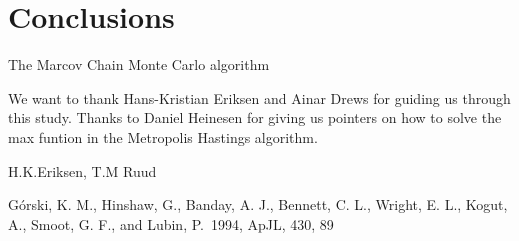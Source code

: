 \documentclass{emulateapj}
\begin{document}



\section{Conclusions}
\label{sec:conclusions}


The Marcov Chain Monte Carlo algorithm 



\begin{acknowledgements}
  We want to thank Hans-Kristian Eriksen and Ainar Drews for guiding us through this study. Thanks to Daniel Heinesen for giving us pointers on how to solve the max funtion in the Metropolis Hastings algorithm.
\end{acknowledgements}

\begin{thebibliography}{}

 H.K.Eriksen, T.M Ruud
\label{bib:assignment}

 G{\'o}rski, K. M.,
  Hinshaw, G., Banday, A. J., Bennett, C. L., Wright, E. L., Kogut,
  A., Smoot, G. F., and Lubin, P.\ 1994, ApJL, 430, 89
\label{bib:gorsky}

\end{thebibliography}
\end{document}
